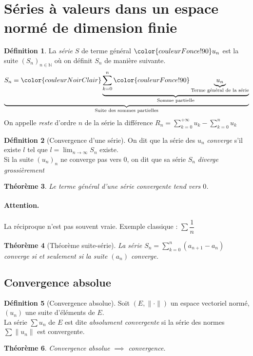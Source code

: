 \documentclass[11pt,a4paper]{report}
\newtheorem{theorem}{Théorème}[chapter]
\newtheorem{itheorem}[theorem]{Théorème}
\theoremstyle{definition}
\newtheorem{dfn}[theorem]{Définition}
\begin{document}
\section{Séries à valeurs dans un espace normé de dimension finie}
\begin{dfn}
La \emph{série} $S$ de terme général $\color{couleurFonce!90} u_n$ est la suite $\left( S_n \right)_{n\in\mathbb{N}}$ où on définit $S_n$ de manière suivante.
    \begin{equation}
    \underbrace{S_n = \color{couleurNoirClair} \underbrace{\sum_{k=0}^{n} \color{couleurFonce!90}\underbrace{u_n}_{\text{Terme général de la série}}}_{\text{Somme partielle}}}_{\text{Suite des sommes partielles}}
    \end{equation}
    On appelle \emph{reste} d'ordre $n$ de la série la différence $R_n = \sum_{k=0}^{+\infty} u_k - \sum_{k=0}^{n} u_k$
\end{dfn}

\begin{dfn}[Convergence d'une série]
    On dit que la série des $u_n$ \emph{converge} s'il existe $l$ tel que $l = \lim_{n\to \infty} S_n$ existe.\\
    Si la suite $(u_n)_n$ ne converge pas vers $0$, on dit que sa série $S_n$ \emph{diverge grossièrement}
\end{dfn}
\begin{theorem}
     Le terme général d'une série convergente tend vers $0$.
\end{theorem}
\paragraph{Attention.} La réciproque n'est pas souvent vraie. Exemple classique : $\sum \dfrac{1}{n}$
\begin{itheorem}[Théorème suite-série]
    La série $S_n = \sum_{k=0}^n (a_{n+1}-a_n)$ converge \emph{\emph{si et seulement si}} la suite $(a_n)$ \emph{converge}.
\end{itheorem}
\subsection{Convergence absolue} %
\label{sub:convergence_absolue}
\begin{dfn}[Convergence absolue]
     Soit $(E, \| \cdot \|)$ un espace vectoriel normé, $(u_n)$ une suite d'éléments de $E$. \\
La série $\sum u_n$ de $E$ est dite \emph{absolument convergente} si la série des normes $\sum \| u_n \|$ est convergente.
\end{dfn}
\begin{itheorem}
     Convergence absolue $\implies $ convergence.
\end{itheorem}
\end{document}
